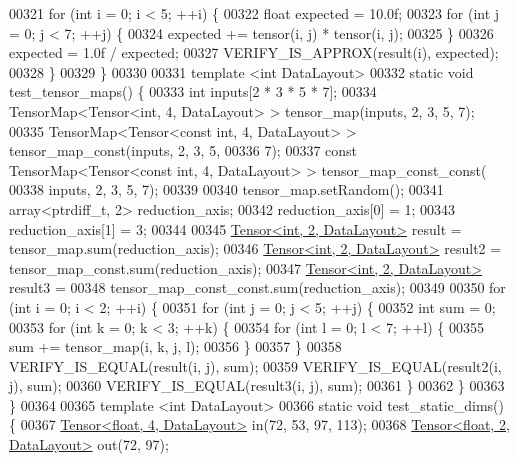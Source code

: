 \begin{DoxyCode}
00321   \textcolor{keywordflow}{for} (\textcolor{keywordtype}{int} i = 0; i < 5; ++i) \{
00322     \textcolor{keywordtype}{float} expected = 10.0f;
00323     \textcolor{keywordflow}{for} (\textcolor{keywordtype}{int} j = 0; j < 7; ++j) \{
00324       expected += tensor(i, j) * tensor(i, j);
00325     \}
00326     expected = 1.0f / expected;
00327     VERIFY\_IS\_APPROX(result(i), expected);
00328   \}
00329 \}
00330 
00331 \textcolor{keyword}{template} <\textcolor{keywordtype}{int} DataLayout>
00332 \textcolor{keyword}{static} \textcolor{keywordtype}{void} test\_tensor\_maps() \{
00333   \textcolor{keywordtype}{int} inputs[2 * 3 * 5 * 7];
00334   TensorMap<Tensor<int, 4, DataLayout> > tensor\_map(inputs, 2, 3, 5, 7);
00335   TensorMap<Tensor<const int, 4, DataLayout> > tensor\_map\_const(inputs, 2, 3, 5,
00336                                                                 7);
00337   \textcolor{keyword}{const} TensorMap<Tensor<const int, 4, DataLayout> > tensor\_map\_const\_const(
00338       inputs, 2, 3, 5, 7);
00339 
00340   tensor\_map.setRandom();
00341   array<ptrdiff\_t, 2> reduction\_axis;
00342   reduction\_axis[0] = 1;
00343   reduction\_axis[1] = 3;
00344 
00345   \hyperlink{class_eigen_1_1_tensor}{Tensor<int, 2, DataLayout>} result = tensor\_map.sum(reduction\_axis);
00346   \hyperlink{class_eigen_1_1_tensor}{Tensor<int, 2, DataLayout>} result2 = tensor\_map\_const.sum(reduction\_axis);
00347   \hyperlink{class_eigen_1_1_tensor}{Tensor<int, 2, DataLayout>} result3 =
00348       tensor\_map\_const\_const.sum(reduction\_axis);
00349 
00350   \textcolor{keywordflow}{for} (\textcolor{keywordtype}{int} i = 0; i < 2; ++i) \{
00351     \textcolor{keywordflow}{for} (\textcolor{keywordtype}{int} j = 0; j < 5; ++j) \{
00352       \textcolor{keywordtype}{int} sum = 0;
00353       \textcolor{keywordflow}{for} (\textcolor{keywordtype}{int} k = 0; k < 3; ++k) \{
00354         \textcolor{keywordflow}{for} (\textcolor{keywordtype}{int} l = 0; l < 7; ++l) \{
00355           sum += tensor\_map(i, k, j, l);
00356         \}
00357       \}
00358       VERIFY\_IS\_EQUAL(result(i, j), sum);
00359       VERIFY\_IS\_EQUAL(result2(i, j), sum);
00360       VERIFY\_IS\_EQUAL(result3(i, j), sum);
00361     \}
00362   \}
00363 \}
00364 
00365 \textcolor{keyword}{template} <\textcolor{keywordtype}{int} DataLayout>
00366 \textcolor{keyword}{static} \textcolor{keywordtype}{void} test\_static\_dims() \{
00367   \hyperlink{class_eigen_1_1_tensor}{Tensor<float, 4, DataLayout>} in(72, 53, 97, 113);
00368   \hyperlink{class_eigen_1_1_tensor}{Tensor<float, 2, DataLayout>} out(72, 97);

\end{DoxyCode}
